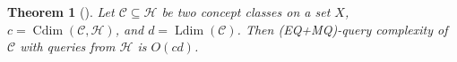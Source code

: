 \documentclass[11pt,a4paper]{amsart}
\newtheorem{theorem}{Theorem}
\theoremstyle{definition}
\newcommand{\mc}{\mathcal}
\DeclareMathOperator{\Ldim}{Ldim}
\DeclareMathOperator{\Cdim}{Cdim}
\DeclareMathOperator{\SCdim}{SCdim}
\begin{document}


\begin{theorem}[{\cite[Theorem 2.24]{chase-freitag:bounds-in-query-learning}}]
\label{thm:query complexity bounds}
Let $\mc C \subseteq \mc H$ be two concept classes on a set $X$, $c = \Cdim(\mc C, \mc H)$, and $d = \Ldim(\mc C)$.
Then (EQ+MQ)-query complexity of $\mc C$ with queries from $\mc H$ is $O(cd)$. 
\end{theorem}
\end{document}
